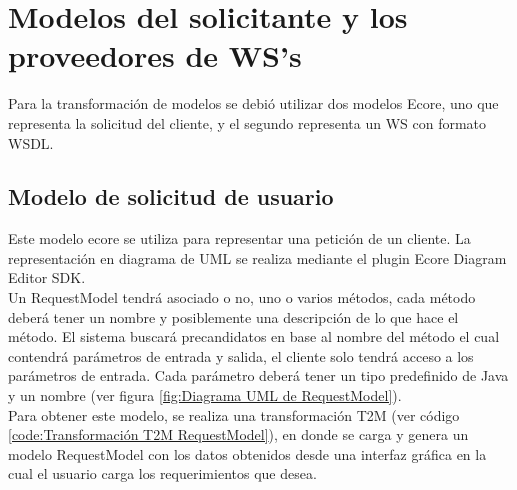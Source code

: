 \section{Modelos del solicitante y los proveedores de WS's}
\label{Modelos del solicitante y los proveedores de WS's}

Para la transformación de modelos se debió utilizar dos modelos Ecore, uno que representa la solicitud del cliente, y el segundo representa un WS con formato WSDL.

\subsection{Modelo de solicitud de usuario}
\label{Modelo de solicitud de usuario}

Este modelo ecore se utiliza para representar una petición  de un cliente. La representación en diagrama de UML se realiza mediante el plugin Ecore Diagram Editor SDK.\\

Un RequestModel tendrá asociado o no, uno o varios métodos, cada método deberá tener un nombre y posiblemente una descripción de lo que hace el método. El sistema buscará precandidatos en base al nombre del método el cual contendrá parámetros de entrada y salida, el cliente solo tendrá acceso a los parámetros de entrada. Cada parámetro deberá tener un tipo predefinido de Java y un nombre (ver figura \ref{fig:Diagrama UML de RequestModel}).\\

Para obtener este modelo, se realiza una transformación T2M (ver código \ref{code:Transformación T2M RequestModel}), en donde se carga y genera un modelo RequestModel con los datos obtenidos desde una interfaz gráfica en la cual el usuario carga los requerimientos que desea.\\







